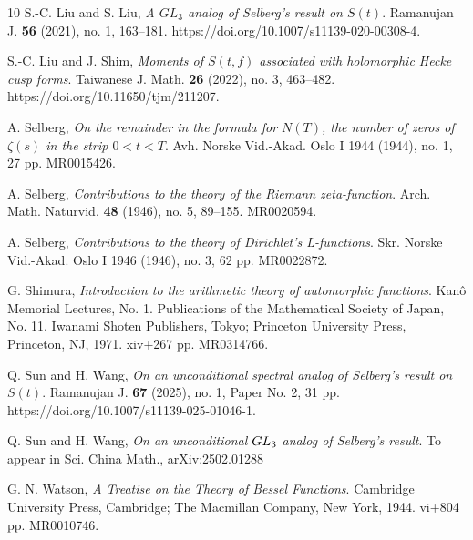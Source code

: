 \documentclass[11pt,reqno]{amsart}
\numberwithin{equation}{section}
\theoremstyle{plain}
\theoremstyle{definition}
\begin{document}
\begin{thebibliography}{10}
S.-C. Liu and S. Liu, {\it A $GL_3$ analog of Selberg's result on $S(t)$}. Ramanujan J. \textbf{56} (2021), no. 1, 163--181.
https://doi.org/10.1007/s11139-020-00308-4.

S.-C. Liu and J. Shim, {\it Moments of $S(t,f)$ associated with holomorphic Hecke cusp forms}.
Taiwanese J. Math. \textbf{26} (2022), no. 3, 463--482.
https://doi.org/10.11650/tjm/211207.

A. Selberg, {\it On the remainder in the formula for $N(T)$, 
the number of zeros of $\zeta(s)$ in the strip $0<t<T$}.
Avh. Norske Vid.-Akad. Oslo I 1944 (1944), no. 1, 27 pp. MR0015426.

A. Selberg, {\it Contributions to the theory of the Riemann zeta-function}.
Arch. Math. Naturvid. \textbf{48} (1946), no. 5, 89--155. MR0020594.

A. Selberg, {\it Contributions to the theory of Dirichlet's L-functions}.
Skr. Norske Vid.-Akad. Oslo I 1946 (1946), no. 3, 62 pp.
MR0022872.

G. Shimura, {\it Introduction to the arithmetic theory of automorphic functions}.
Kan\^{o} Memorial Lectures, No. 1. Publications of the Mathematical Society of Japan, No. 11.
Iwanami Shoten Publishers, Tokyo; Princeton University Press, Princeton, NJ, 1971. xiv+267 pp.
MR0314766.

Q. Sun and H. Wang, {\it On an unconditional spectral analog of Selberg's result on $S(t)$}.
Ramanujan J. \textbf{67} (2025), no. 1, Paper No. 2, 31 pp.
https://doi.org/10.1007/s11139-025-01046-1.

Q. Sun and H. Wang, {\it On an unconditional $\rm GL_3$ analog of Selberg's result}. To appear in Sci. China Math., arXiv:2502.01288

G. N. Watson,  {\it A Treatise on the Theory of Bessel Functions}. Cambridge University Press, Cambridge;
The Macmillan Company, New York, 1944. vi+804 pp. MR0010746.
\end{thebibliography}
\end{document}
